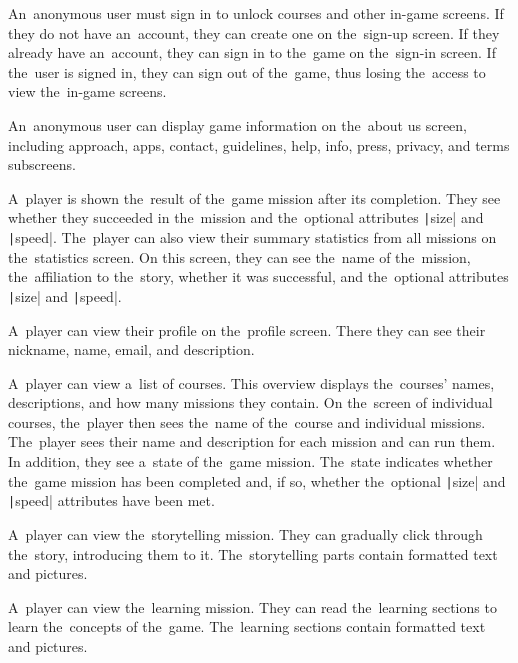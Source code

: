 \pagebreak
\begin{enumerate}[label=\textbf{F\arabic*}, ref=\labelenumi]
     An~anonymous user must sign in to unlock courses and other in-game screens.
    If they do not have an~account, they can create one on the~sign-up screen.
    If they already have an~account, they can sign in to the~game on the~sign-in screen.
    If the~user is signed in, they can sign out of the~game, thus losing the~access to view the~in-game screens.

     An~anonymous user can display game information on the~about us screen, including approach, apps, contact, guidelines, help, info, press, privacy, and terms subscreens.

     A~player is shown the~result of the~game mission after its completion.
    They see whether they succeeded in the~mission and the~optional attributes \texttt|size| and \texttt|speed|.
    The~player can also view their summary statistics from all missions on the~statistics screen.
    On this screen, they can see the~name of the~mission, the~affiliation to the~story, whether it was successful, and the~optional attributes \texttt|size| and \texttt|speed|.

     A~player can view their profile on the~profile screen.
    There they can see their nickname, name, email, and description.

     A~player can view a~list of courses.
    This overview displays the~courses' names, descriptions, and how many missions they contain.
    On the~screen of individual courses, the~player then sees the~name of the~course and individual missions.
    The~player sees their name and description for each mission and can run them.
    In addition, they see a~state of the~game mission.
    The~state indicates whether the~game mission has been completed and, if so, whether the~optional \texttt|size| and \texttt|speed| attributes have been met.

     A~player can view the~storytelling mission.
    They can gradually click through the~story, introducing them to it.
    The~storytelling parts contain formatted text and pictures.

     A~player can view the~learning mission.
    They can read the~learning sections to learn the~concepts of the~game.
    \linebreak
    The~learning sections contain formatted text and pictures. 
    

\end{enumerate}
